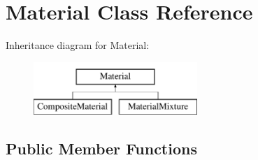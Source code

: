 \hypertarget{classMaterial}{}\section{Material Class Reference}
\label{classMaterial}
Inheritance diagram for Material\+:\begin{figure}[H]
\begin{center}
\leavevmode
\includegraphics[height=2.000000cm]{classMaterial}
\end{center}
\end{figure}
\subsection*{Public Member Functions}
